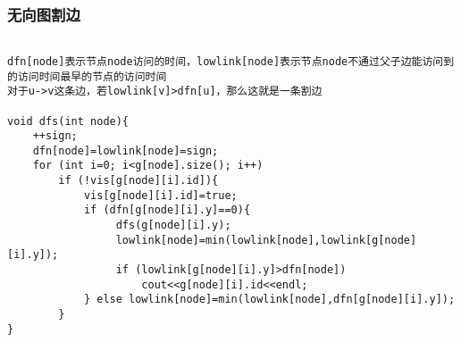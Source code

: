 \subsubsection{无向图割边}
\begin{verbatim}

dfn[node]表示节点node访问的时间，lowlink[node]表示节点node不通过父子边能访问到的访问时间最早的节点的访问时间
对于u->v这条边，若lowlink[v]>dfn[u]，那么这就是一条割边

void dfs(int node){
    ++sign;
    dfn[node]=lowlink[node]=sign;
    for (int i=0; i<g[node].size(); i++)
        if (!vis[g[node][i].id]){
            vis[g[node][i].id]=true;
            if (dfn[g[node][i].y]==0){
                 dfs(g[node][i].y);
                 lowlink[node]=min(lowlink[node],lowlink[g[node][i].y]);
                 if (lowlink[g[node][i].y]>dfn[node])
                     cout<<g[node][i].id<<endl;
            } else lowlink[node]=min(lowlink[node],dfn[g[node][i].y]);
        }
}
\end{verbatim}
